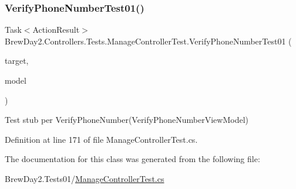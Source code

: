 \subsubsection{\texorpdfstring{Verify\+Phone\+Number\+Test01()}{VerifyPhoneNumberTest01()}}
{\footnotesize\ttfamily Task$<$Action\+Result$>$ Brew\+Day2.\+Controllers.\+Tests.\+Manage\+Controller\+Test.\+Verify\+Phone\+Number\+Test01 (\begin{DoxyParamCaption}\item[{\mbox{[}\+Pex\+Assume\+Under\+Test\mbox{]} \mbox{\hyperlink{class_brew_day2_1_1_controllers_1_1_manage_controller}{Manage\+Controller}}}]{target,  }\item[{\mbox{\hyperlink{class_brew_day2_1_1_models_1_1_verify_phone_number_view_model}{Verify\+Phone\+Number\+View\+Model}}}]{model }\end{DoxyParamCaption})}



Test stub per Verify\+Phone\+Number(\+Verify\+Phone\+Number\+View\+Model)



Definition at line 171 of file Manage\+Controller\+Test.\+cs.



The documentation for this class was generated from the following file\+:\begin{DoxyCompactItemize}
\item 
Brew\+Day2.\+Tests01/\mbox{\hyperlink{1_2_manage_controller_test_8cs}{Manage\+Controller\+Test.\+cs}}\end{DoxyCompactItemize}
